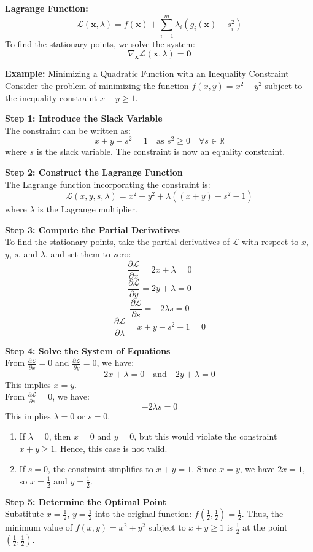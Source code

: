 \documentclass[]{article}
\begin{document}
	\textbf{Lagrange Function:}
	$$
	\mathcal{L}(\mathbf{x}, \lambda)
	= f(\mathbf{x}) + \sum_{i=1}^m \lambda_i \left( g_i(\mathbf{x}) - s_i^2 \right)
	$$
	To find the stationary points, we solve the system:
	$$
	\nabla_\mathbf{x} \mathcal{L}(\mathbf{x}, \lambda) = \mathbf{0}
	$$
	
	\textbf{Example:}
	Minimizing a Quadratic Function with an Inequality Constraint\\
	Consider the problem of minimizing the function $f(x, y) = x^2 + y^2$ subject to the inequality constraint $x + y \geq 1$.
	
	\textbf{Step 1: Introduce the Slack Variable}\\
	The constraint can be written as:
	$$
	x + y - s^2 = 1 \quad \text{as } s^2 \geq 0 \quad \forall s \in \mathbb{R}
	$$
	where $s$ is the slack variable.
	The constraint is now an equality constraint.
	
	\textbf{Step 2: Construct the Lagrange Function}\\
	The Lagrange function incorporating the constraint is:
	$$
	\mathcal{L}(x, y, s, \lambda) = x^2 + y^2 + \lambda \left( (x + y) - s^2 - 1 \right)
	$$
	where $\lambda$ is the Lagrange multiplier.
	
	\textbf{Step 3: Compute the Partial Derivatives}\\
	To find the stationary points, take the partial derivatives of $\mathcal{L}$ with respect to $x$, $y$, $s$, and $\lambda$, and set them to zero:
	$$
	\frac{\partial \mathcal{L}}{\partial x} = 2x + \lambda = 0
	$$
	$$
	\frac{\partial \mathcal{L}}{\partial y} = 2y + \lambda = 0
	$$
	$$
	\frac{\partial \mathcal{L}}{\partial s} = -2\lambda s = 0
	$$
	$$
	\frac{\partial \mathcal{L}}{\partial \lambda} = x + y - s^2 - 1 = 0
	$$
	
	\textbf{Step 4: Solve the System of Equations}\\
	From $\frac{\partial \mathcal{L}}{\partial x} = 0$ and $\frac{\partial \mathcal{L}}{\partial y} = 0$, we have:
	$$
	2x + \lambda = 0 \quad \text{and} \quad 2y + \lambda = 0
	$$
	This implies $x = y$.\\
	From $\frac{\partial \mathcal{L}}{\partial s} = 0$, we have:
	$$
	-2\lambda s = 0
	$$
	This implies $\lambda = 0$ or $s = 0$. 
	
	\begin{enumerate}
		\item If $\lambda = 0$, then $x = 0$ and $y = 0$, but this would violate the constraint $x + y \geq 1$.
		Hence, this case is not valid.
		\item If $s = 0$, the constraint simplifies to $x + y = 1$.
		Since $x = y$, we have $2x = 1$, so $x = \frac{1}{2}$ and $y = \frac{1}{2}$.
	\end{enumerate}
	
	\textbf{Step 5: Determine the Optimal Point}\\
	Substitute $x = \frac{1}{2}$, $y = \frac{1}{2}$ into the original function:
	$f\left(\frac{1}{2}, \frac{1}{2}\right) = \frac{1}{2}$.
	Thus, the minimum value of $f(x, y) = x^2 + y^2$ subject to $x + y \geq 1$ is $\frac{1}{2}$ at the point $\left(\frac{1}{2}, \frac{1}{2}\right)$.
	
\end{document}
